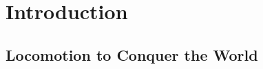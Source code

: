 \documentclass[main]{subfiles}
\begin{document}
\setcounter{chapter}{0}

\chapter{Introduction} %

\label{Chapter\thechapter} %


\section{Locomotion to Conquer the World}
\end{document}
